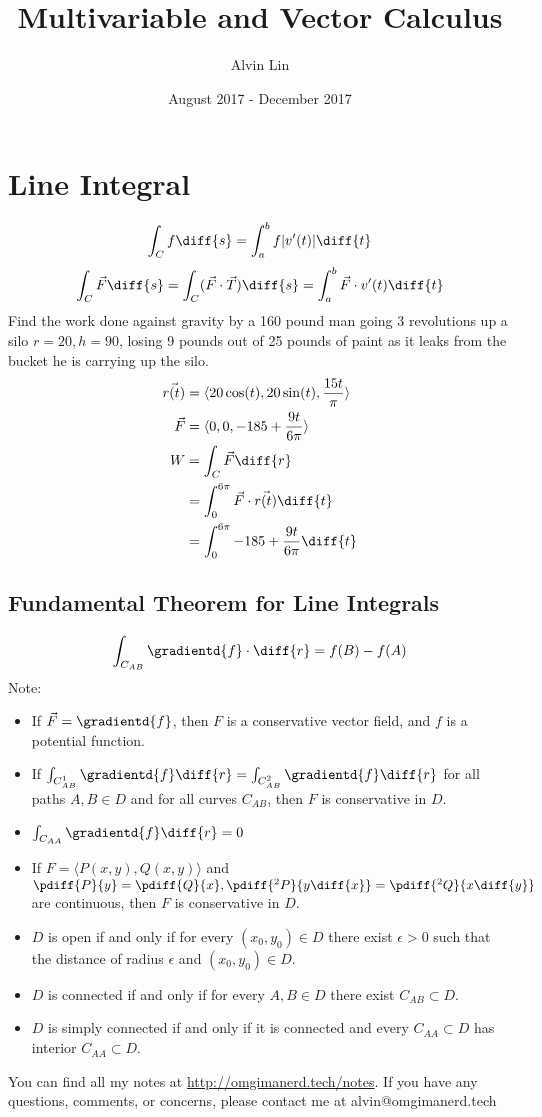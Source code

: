 \documentclass{math}
\title{Multivariable and Vector Calculus}
\author{Alvin Lin}
\date{August 2017 - December 2017}
\begin{document}
\maketitle

\section*{Line Integral}
\[ \int_{C}f\diff{s} = \int_{a}^{b}f|v'(t)|\diff{t} \]
\[ \int_{C}\vec{F}\diff{s} = \int_{C}(\vec{F}\cdot\vec{T})\diff{s} =
  \int_{a}^{b}\vec{F}\cdot v'(t)\diff{t} \]
Find the work done against gravity by a 160 pound man going 3 revolutions up a
silo \( r = 20, h = 90 \), losing 9 pounds out of 25 pounds of paint as it leaks
from the bucket he is carrying up the silo.
\begin{align*}
  \vec{r(t)} &= \langle20\cos(t),20\sin(t),\frac{15t}{\pi}\rangle \\
  \vec{F} &= \langle0,0,-185+\frac{9t}{6\pi}\rangle \\
  W &= \int_{C}\vec{F}\diff{r} \\
  &= \int_{0}^{6\pi}\vec{F}\cdot\vec{r(t)}\diff{t} \\
  &= \int_{0}^{6\pi}-185+\frac{9t}{6\pi}\diff{t}
\end{align*}

\subsection*{Fundamental Theorem for Line Integrals}
\[ \int_{C_{AB}}\gradientd{f}\cdot\diff{r} = f(B)-f(A) \]
Note:
\begin{itemize}
  \item If \( \vec{F} = \gradientd{f} \), then \( F \) is a conservative vector
  field, and \( f \) is a potential function.
  \item If \( \int_{C_{AB}^1}\gradientd{f}\diff{r} =
  \int_{C_{AB}^2}\gradientd{f}\diff{r} \) for all paths \( A,B\in D \) and
  for all curves \( C_{AB} \), then \( F \) is conservative in \( D \).
  \item \( \int_{C_{AA}}\gradientd{f}\diff{r} = 0 \)
  \item If \( F = \langle P(x,y),Q(x,y)\rangle \) and \( \pdiff{P}{y} =
  \pdiff{Q}{x}, \pdiff{^2P}{y\diff{x}} = \pdiff{^2Q}{x\diff{y}} \) are
  continuous, then \( F \) is conservative in \( D \).
  \item \( D \) is open if and only if for every \( (x_0,y_0)\in D \) there
  exist \( \epsilon>0 \) such that the distance of radius \( \epsilon \) and
  \( (x_0,y_0)\in D \).
  \item \( D \) is connected if and only if for every \( A,B\in D \) there exist
  \( C_{AB}\subset D \).
  \item \( D \) is simply connected if and only if it is connected and every
  \( C_{AA}\subset D \) has interior \( C_{AA}\subset D \).
\end{itemize}

\begin{center}
  You can find all my notes at \url{http://omgimanerd.tech/notes}. If you have
  any questions, comments, or concerns, please contact me at
  alvin@omgimanerd.tech
\end{center}
\end{document}

